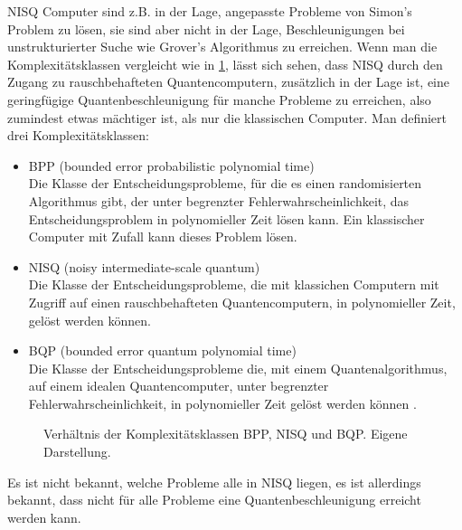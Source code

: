 NISQ Computer sind z.B. in der Lage, angepasste Probleme von Simon's Problem zu lösen, sie sind aber nicht in der Lage, Beschleunigungen bei unstrukturierter Suche wie Grover's Algorithmus zu erreichen.
Wenn man die Komplexitätsklassen vergleicht wie in \ref{fig:bpp-nisq-bqp}, lässt sich sehen, dass NISQ durch den Zugang zu rauschbehafteten Quantencomputern, zusätzlich in der Lage ist, eine geringfügige Quantenbeschleunigung für manche Probleme zu erreichen, also zumindest etwas mächtiger ist, als nur die klassischen Computer.
Man definiert drei Komplexitätsklassen:
\begin{itemize}
    \item BPP (bounded error probabilistic polynomial time)\\
    Die Klasse der Entscheidungsprobleme, für die es einen randomisierten Algorithmus gibt, der unter begrenzter Fehlerwahrscheinlichkeit, das Entscheidungsproblem in polynomieller Zeit lösen kann.
    Ein klassischer Computer mit Zufall kann dieses Problem lösen.
    \item NISQ (noisy intermediate-scale quantum)\\
    Die Klasse der Entscheidungsprobleme, die mit klassichen Computern mit Zugriff auf einen rauschbehafteten Quantencomputern, in polynomieller Zeit, gelöst werden können.
    \item BQP (bounded error quantum polynomial time)\\
    Die Klasse der Entscheidungsprobleme die, mit einem Quantenalgorithmus, auf einem idealen Quantencomputer, unter begrenzter Fehlerwahrscheinlichkeit, in polynomieller Zeit gelöst werden können \cite{homeisterQuantumComputingVerstehen2015}.
\end{itemize}
\begin{figure}[htbp]
\centering
{}
\caption{Verhältnis der Komplexitätsklassen BPP, NISQ und BQP. Eigene Darstellung.}
\label{fig:bpp-nisq-bqp}
\end{figure}
Es ist nicht bekannt, welche Probleme alle in NISQ liegen, es ist allerdings bekannt, dass nicht für alle Probleme eine Quantenbeschleunigung erreicht werden kann.
